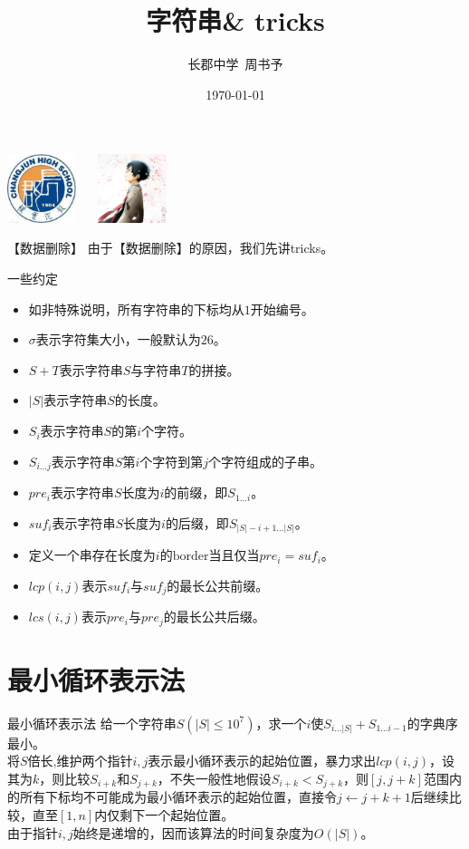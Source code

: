 \documentclass{beamer}
\title{字符串\& tricks}
\author{长郡中学\ 周书予}
\date{\today}
\begin{document}
\small
	
	\begin{frame}
	\titlepage
		\begin{center}
		\includegraphics[width=2.0cm]{cj.jpg}
		$\ \ \ \ \ $
		\includegraphics[width=2.0cm]{zsy.png}
		\end{center}
	\end{frame}
	\begin{frame}{【数据删除】}
		由于【数据删除】的原因，我们先讲tricks。
	\end{frame}
	\begin{frame}{一些约定}
		\begin{itemize}
			\item 如非特殊说明，所有字符串的下标均从$1$开始编号。
			\item $\sigma$表示字符集大小，一般默认为$26$。
			\item $S+T$表示字符串$S$与字符串$T$的拼接。
			\item $|S|$表示字符串$S$的长度。
			\item $S_i$表示字符串$S$的第$i$个字符。
			\item $S_{i...j}$表示字符串$S$第$i$个字符到第$j$个字符组成的子串。
			\item $pre_i$表示字符串$S$长度为$i$的前缀，即$S_{1...i}$。
			\item $suf_i$表示字符串$S$长度为$i$的后缀，即$S_{|S|-i+1...|S|}$。
			\item 定义一个串存在长度为$i$的$\mathrm{border}$当且仅当$pre_i=suf_i$。
			\item $lcp(i,j)$表示$suf_i$与$suf_j$的最长公共前缀。
			\item $lcs(i,j)$表示$pre_i$与$pre_j$的最长公共后缀。
		\end{itemize}
	\end{frame}
	\section{最小循环表示法}
	\begin{frame}{最小循环表示法}
		给一个字符串$S(|S|\le10^7)$，求一个$i$使$S_{i...|S|}+S_{1...i-1}$的字典序最小。
		\pause\\
		
		将$S$倍长,维护两个指针$i,j$表示最小循环表示的起始位置，暴力求出$lcp(i,j)$，设其为$k$，则比较$S_{i+k}$和$S_{j+k}$，不失一般性地假设$S_{i+k}<S_{j+k}$，则$[j,j+k]$范围内的所有下标均不可能成为最小循环表示的起始位置，直接令$j \gets j+k+1$后继续比较，直至$[1,n]$内仅剩下一个起始位置。
		\pause\\
		
		由于指针$i,j$始终是递增的，因而该算法的时间复杂度为$O(|S|)$。
	\end{frame}
\end{document}
